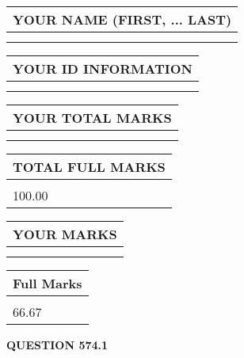\documentclass{ctexart}
\begin{document}
   
   
   
\newpage 
\setcounter{page}{ 
   574001 } 
   
   
   
   
\noindent\begin{tabular}{|l|}
\hline
YOUR NAME (FIRST, ... LAST)  \\
\hline
 \\ 
 \\ 
\hline
\end{tabular}
\hspace{0.05in} \begin{tabular}{|l|}
\hline
 YOUR   ID   INFORMATION  \\
\hline
 \\ 
 \\ 
\hline
\end{tabular}
   
   
\vspace{0.2in}\noindent\begin{tabular}{|l|}
\hline
YOUR TOTAL MARKS  \\
\hline
 \\ 
 \\ 
\hline
\end{tabular}
\hspace{0.05in} \begin{tabular}{|l|}
\hline
TOTAL FULL MARKS  \\
\hline
 \\ 
100.00 \\
\hline
\end{tabular}
   
   
 \vspace{0.2in}
 
 
 
 
   
   
  
\vspace{0.2in}
  
\noindent\begin{tabular}{|l|}
\hline
 YOUR MARKS  \\
\hline
 \\ 
 \\ 
\hline
\end{tabular}
\hspace{0.05in} \begin{tabular}{|l|}
\hline
 Full Marks  \\
\hline
 \\ 
66.67 \\
\hline
\end{tabular}
{\textbf{\Large{QUESTION
574.1 
}}}
  
\end{document}
